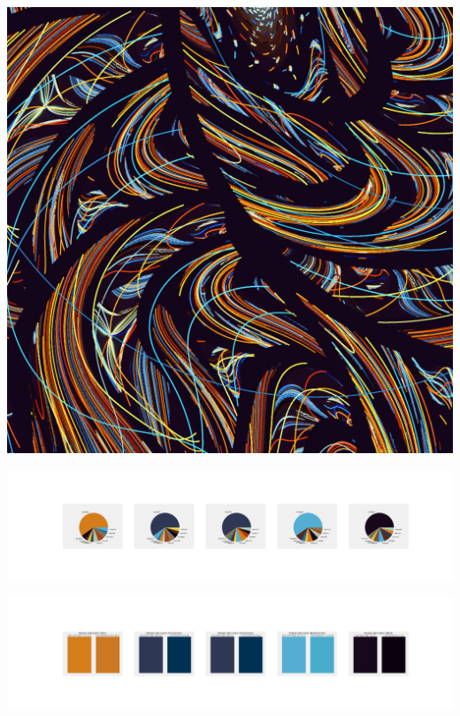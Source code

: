 \documentclass[11pt]{article}
\begin{document}
\begin{landscape}
    \begin{center}
    \includegraphics[width=\textwidth]{./nbimg/file (321).jpg}
    \end{center}

    \begin{center}
    \includegraphics[width=250mm]{./nbimg/pie-247.jpg}
    \end{center}

    \begin{center}
    \includegraphics[width=250mm]{./nbimg/peak-247.jpg}
    \end{center}
    


\end{landscape}
\end{document}
